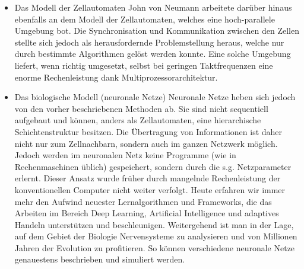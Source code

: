 \begin{itemize}
		\item Das Modell der Zellautomaten
			\subitem John von Neumann arbeitete darüber hinaus ebenfalls an dem Modell der Zellautomaten, welches eine hoch-parallele Umgebung bot. Die Synchronisation und Kommunikation zwischen den Zellen stellte sich jedoch als herausfordernde Problemstellung heraus, welche nur durch bestimmte Algorithmen gelöst werden konnte. Eine solche Umgebung liefert, wenn richtig umgesetzt, selbst bei geringen Taktfrequenzen eine enorme Rechenleistung dank Multiprozessorarchitektur.
		\item Das biologische Modell (neuronale Netze)
			\subitem Neuronale Netze heben sich jedoch von den vorher beschriebenen Methoden ab. Sie sind nicht sequentiell aufgebaut und können, anders als Zellautomaten, eine hierarchische Schichtenstruktur besitzen. Die Übertragung von Informationen ist daher nicht nur zum Zellnachbarn, sondern auch im ganzen Netzwerk möglich. Jedoch werden im neuronalen Netz keine Programme (wie in Rechenmaschinen üblich) gespeichert, sondern durch die s.g. Netzparameter erlernt. Dieser Ansatz wurde früher durch mangelnde Rechenleistung der konventionellen Computer nicht weiter verfolgt. Heute erfahren wir immer mehr den Aufwind neuester Lernalgorithmen und Frameworks, die das Arbeiten im Bereich Deep Learning, Artificial Intelligence und adaptives Handeln unterstützen und beschleunigen. Weitergehend ist man in der Lage, auf dem Gebiet der Biologie Nervensysteme zu analysieren und von Millionen Jahren der Evolution zu profitieren. So können verschiedene neuronale Netze genauestens beschrieben und simuliert werden.
	\end{itemize}
